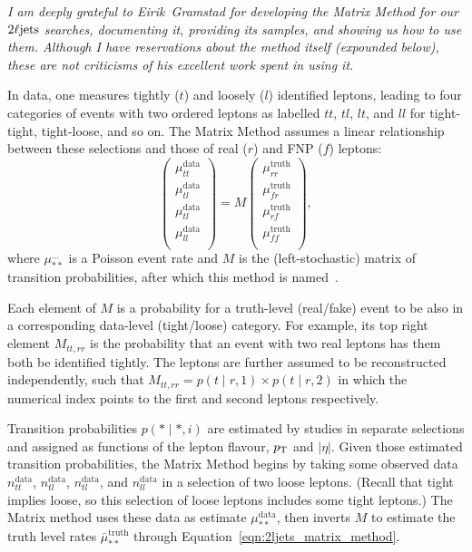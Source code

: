 \emph{
I am deeply grateful to Eirik~Gramstad for developing the Matrix Method for our
$2\ell\mathrm{jets}$ searches, documenting it, providing its samples, and showing us how
to use them.
Although I have reservations about the method itself (expounded below), these
are not criticisms of his excellent work spent in using it.
}

In data, one measures tightly ($t$) and loosely ($l$) identified leptons, leading
to four categories of events with two ordered leptons as labelled $tt$, $tl$,
$lt$, and $ll$ for tight-tight, tight-loose, and so on.
The Matrix Method assumes a linear relationship between these selections
and those of real ($r$) and FNP ($f$) leptons:
\begin{equation}
\label{eqn:2ljets_matrix_method}
\begin{pmatrix}
\mu^\textrm{data}_{tt} \\
\mu^\textrm{data}_{tl} \\
\mu^\textrm{data}_{tl} \\
\mu^\textrm{data}_{ll} \\
\end{pmatrix}
=
M
\begin{pmatrix}
\mu^\textrm{truth}_{rr} \\
\mu^\textrm{truth}_{fr} \\
\mu^\textrm{truth}_{rf} \\
\mu^\textrm{truth}_{ff} \\
\end{pmatrix}
,
\end{equation}
where $\mu^{\ldots}_{**}$ is a Poisson event rate and $M$ is the
(left-stochastic) matrix of transition probabilities, after which this method
is named~\cite{ATLAS-CONF-2014-058}.

Each element of $M$ is a probability for a truth-level (real/fake) event to be
also in a corresponding data-level (tight/loose) category.
For example, its top right element $M_{{tt}, {rr}}$ is the
probability that an event with two real leptons has them both be identified
tightly.
The leptons are further assumed to be reconstructed independently, such that
$M_{{tt}, {rr}} =
p(t\!\mid\!r,1)
\times p(t\!\mid\!r,2)$
in which the numerical index points to the first and second leptons
respectively.

Transition probabilities $p(*\!\mid\!*,i)$ are estimated by studies in
separate selections and assigned as functions of the lepton
flavour, $p_\mathrm{T}$ and $|\eta|$.
Given those estimated transition probabilities, the Matrix Method begins by
taking some observed data
$n^\textrm{data}_{tt}$,
$n^\textrm{data}_{tl}$,
$n^\textrm{data}_{tl}$,
and $n^\textrm{data}_{ll}$
in a selection of two loose leptons.
(Recall that tight implies loose, so this selection of loose leptons includes
some tight leptons.)
The Matrix method uses these data as estimate $\mu^\textrm{data}_{**}$,
then inverts $M$ to estimate the truth level rates
$\bar \mu^\textrm{truth}_{**}$ through Equation~\ref{eqn:2ljets_matrix_method}.

